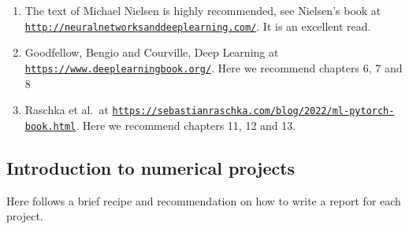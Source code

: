 \documentclass[%
oneside,                 %
final,                   %
10pt]{article}
\begin{document}
\begin{enumerate}
\item The text of Michael Nielsen is highly recommended, see Nielsen's book at \href{{http://neuralnetworksanddeeplearning.com/}}{\nolinkurl{http://neuralnetworksanddeeplearning.com/}}. It is an excellent read.

\item Goodfellow, Bengio and Courville, Deep Learning at \href{{https://www.deeplearningbook.org/}}{\nolinkurl{https://www.deeplearningbook.org/}}. Here we recommend chapters 6, 7 and 8

\item Raschka et al.~at \href{{https://sebastianraschka.com/blog/2022/ml-pytorch-book.html}}{\nolinkurl{https://sebastianraschka.com/blog/2022/ml-pytorch-book.html}}. Here we recommend chapters 11, 12 and 13.
\end{enumerate}

\noindent
\subsection*{Introduction to numerical projects}

Here follows a brief recipe and recommendation on how to write a report for each
project.
\end{document}
